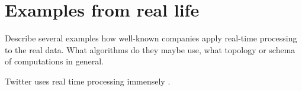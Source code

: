 \section{Examples from real life}

Describe several examples how well-known companies apply real-time processing to the real data.
What algorithms do they maybe use, what topology or schema of computations in general.

Twitter uses real time processing immensely \cite{Toshniwal2014}.
